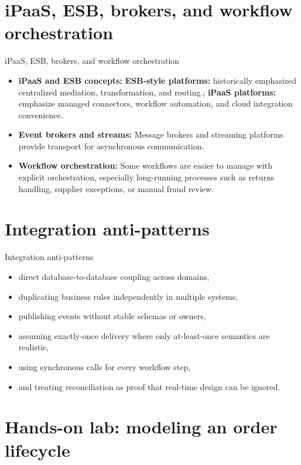 \documentclass[aspectratio=169]{beamer}
\begin{document}
\section{iPaaS, ESB, brokers, and workflow orchestration}

\begin{frame}{iPaaS, ESB, brokers, and workflow orchestration}
  \begin{itemize}
    \item \textbf{iPaaS and ESB concepts:} \textbf{ESB-style platforms:} historically emphasized centralized mediation, transformation, and routing.; \textbf{iPaaS platforms:} emphasize managed connectors, workflow automation, and cloud integration convenience.
    \item \textbf{Event brokers and streams:} Message brokers and streaming platforms provide transport for asynchronous communication.
    \item \textbf{Workflow orchestration:} Some workflows are easier to manage with explicit orchestration, especially long-running processes such as returns handling, supplier exceptions, or manual fraud review.
  \end{itemize}
\end{frame}

\section{Integration anti-patterns}

\begin{frame}{Integration anti-patterns}
  \begin{itemize}
    \item direct database-to-database coupling across domains,
    \item duplicating business rules independently in multiple systems,
    \item publishing events without stable schemas or owners,
    \item assuming exactly-once delivery where only at-least-once semantics are realistic,
    \item using synchronous calls for every workflow step,
    \item and treating reconciliation as proof that real-time design can be ignored.
  \end{itemize}
\end{frame}

\section{Hands-on lab: modeling an order lifecycle}
\end{document}
